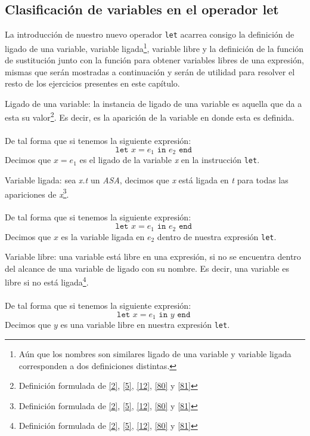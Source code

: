     \bigskip

    \subsection{Clasificación de variables en el operador let}
    
    La introducción de nuestro nuevo operador \texttt{let} acarrea consigo la definición de ligado de una variable, variable ligada\footnote{Aún que los nombres son similares ligado de una variable y variable ligada corresponden a dos definiciones distintas.}, variable libre y la definición de la función de sustitución junto con la función para obtener variables libres de una expresión, mismas que serán mostradas a continuación y serán de utilidad para resolver el resto de los ejercicios presentes en este capítulo.\\
    
    \begin{definition}Ligado de una variable: la instancia de ligado de una variable es aquella que da a esta su valor\footnote{Definición formulada de \hyperlink{2}{[2]}, \hyperlink{5}{[5]}, \hyperlink{12}{[12]}, \hyperlink{80}{[80]} y \hyperlink{81}{[81]}}. Es decir, es la aparición de la variable en donde esta es definida. \\\\
    De tal forma que si tenemos la siguiente expresión: \[ \texttt{let } x = e_1 \texttt{ in } e_2 \texttt{ end } \] Decimos que $x = e_1$ es el ligado de la variable \textit{x} en la instrucción \texttt{let}.
    \end{definition}

    \bigskip

    \begin{definition}Variable ligada: sea \textit{x.t} un \textit{ASA}, decimos que \textit{x} está ligada en \textit{t} para todas las apariciones de \textit{x}\footnote{Definición formulada de \hyperlink{2}{[2]}, \hyperlink{5}{[5]}, \hyperlink{12}{[12]}, \hyperlink{80}{[80]} y \hyperlink{81}{[81]}}.\\\\
    De tal forma que si tenemos la siguiente expresión: \[ \texttt{let } x = e_1 \texttt{ in } e_2 \texttt{ end } \] Decimos que $x $ es la variable ligada en $e_2$ dentro de nuestra expresión \texttt{let}.
    \end{definition}

    \bigskip

    \begin{definition}Variable libre: una variable está libre en una expresión, si no se encuentra dentro del alcance de una variable de ligado con su nombre. Es decir, una variable es libre si no está ligada\footnote{Definición formulada de  \hyperlink{2}{[2]}, \hyperlink{5}{[5]}, \hyperlink{12}{[12]}, \hyperlink{80}{[80]} y \hyperlink{81}{[81]}}.\\\\
    De tal forma que si tenemos la siguiente expresión: \[ \texttt{let } x = e_1 \texttt{ in } y \texttt{ end } \] Decimos que $y$ es una variable libre en nuestra expresión \texttt{let}.
    \end{definition}


